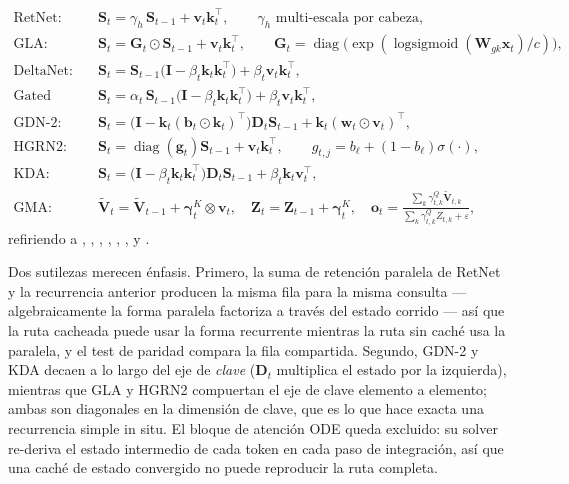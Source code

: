 \begin{align}
\text{RetNet:}\quad & \mathbf{S}_t = \gamma_h\,\mathbf{S}_{t-1} + \mathbf{v}_t\mathbf{k}_t^\top, \qquad \gamma_h \text{ multi-escala por cabeza}, \\
\text{GLA:}\quad & \mathbf{S}_t = \mathbf{G}_t \odot \mathbf{S}_{t-1} + \mathbf{v}_t\mathbf{k}_t^\top, \qquad \mathbf{G}_t = \operatorname{diag}\big(\exp(\operatorname{logsigmoid}(\mathbf{W}_{gk}\mathbf{x}_t)/c)\big), \\
\text{DeltaNet:}\quad & \mathbf{S}_t = \mathbf{S}_{t-1}\big(\mathbf{I} - \beta_t\mathbf{k}_t\mathbf{k}_t^\top\big) + \beta_t\mathbf{v}_t\mathbf{k}_t^\top, \\
\text{Gated DeltaNet:}\quad & \mathbf{S}_t = \alpha_t\,\mathbf{S}_{t-1}\big(\mathbf{I} - \beta_t\mathbf{k}_t\mathbf{k}_t^\top\big) + \beta_t\mathbf{v}_t\mathbf{k}_t^\top, \\
\text{GDN-2:}\quad & \mathbf{S}_t = \big(\mathbf{I} - \mathbf{k}_t(\mathbf{b}_t\odot\mathbf{k}_t)^\top\big)\mathbf{D}_t\mathbf{S}_{t-1} + \mathbf{k}_t(\mathbf{w}_t\odot\mathbf{v}_t)^\top, \\
\text{HGRN2:}\quad & \mathbf{S}_t = \operatorname{diag}(\mathbf{g}_t)\mathbf{S}_{t-1} + \mathbf{v}_t\mathbf{k}_t^\top, \qquad g_{t,j} = b_\ell + (1-b_\ell)\sigma(\cdot), \\
\text{KDA:}\quad & \mathbf{S}_t = \big(\mathbf{I} - \beta_t\mathbf{k}_t\mathbf{k}_t^\top\big)\mathbf{D}_t\mathbf{S}_{t-1} + \beta_t\mathbf{k}_t\mathbf{v}_t^\top, \\
\text{GMA:}\quad & \tilde{\mathbf{V}}_t = \tilde{\mathbf{V}}_{t-1} + \boldsymbol{\gamma}^{K}_t \otimes \mathbf{v}_t,\quad \mathbf{Z}_t = \mathbf{Z}_{t-1} + \boldsymbol{\gamma}^{K}_t, \quad \mathbf{o}_t = \frac{\sum_k \gamma^{Q}_{t,k}\tilde{\mathbf{V}}_{t,k}}{\sum_k \gamma^{Q}_{t,k}Z_{t,k} + \varepsilon},
\end{align}
refiriendo a \citet{sun_retentive_2023}, \citet{yang_gla_2023}, \citet{yang_deltanet_2024}, \citet{yang_gated_deltanet_2024}, \citet{hatamizadeh_gated_deltanet2_2026}, \citet{qin_hgrn2_2024}, \citet{kimi_kda_2025} y \citet{huang_gma_2026}.

Dos sutilezas merecen énfasis. Primero, la suma de retención paralela de RetNet y la recurrencia anterior producen la misma fila para la misma consulta --- algebraicamente la forma paralela factoriza a través del estado corrido --- así que la ruta cacheada puede usar la forma recurrente mientras la ruta sin caché usa la paralela, y el test de paridad compara la fila compartida. Segundo, GDN-2 y KDA decaen a lo largo del eje de \emph{clave} ($\mathbf{D}_t$ multiplica el estado por la izquierda), mientras que GLA y HGRN2 compuertan el eje de clave elemento a elemento; ambas son diagonales en la dimensión de clave, que es lo que hace exacta una recurrencia simple in situ. El bloque de atención ODE queda excluido: su solver re-deriva el estado intermedio de cada token en cada paso de integración, así que una caché de estado convergido no puede reproducir la ruta completa.

